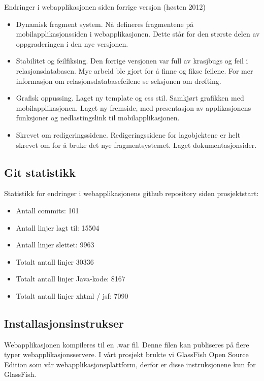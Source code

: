 \documentclass[../main.tex]{subfiles}
\begin{document}
\newpage

Endringer i webapplikasjonen siden forrige versjon (høsten 2012)
\begin{itemize}
\item Dynamisk fragment system. Nå defineres fragmentene på mobilapplikasjonssiden i webapplikasjonen. Dette står for den største delen av oppgraderingen i den nye versjonen.
\item Stabilitet og feilfiksing. Den forrige versjonen var full av krasjbugs og feil i relasjonsdatabasen. Mye arbeid ble gjort for å finne og fikse feilene. For mer informasjon om relasjonsdatabasefeilene se seksjonen om drøfting.
\item Grafisk oppussing. Laget ny template og css stil. Samkjørt grafikken med mobilapplikasjonen. Laget ny fremside, med presentasjon av applikasjonens funksjoner og nedlastingslink til mobilapplikasjonen.
\item Skrevet om redigeringssidene. Redigeringssidene for lagobjektene er helt skrevet om for å bruke det nye fragmentsystemet.
Laget dokumentasjonsider.
\end{itemize}

\subsection{Git statistikk}

Statistikk for endringer i webapplikasjonens github repository siden prosjektstart:
\begin{itemize}
\item Antall commits: 101
\item Antall linjer lagt til: 15504
\item Antall linjer slettet: 9963
\item Totalt antall linjer 30336
\item Totalt antall linjer Java-kode: 8167
\item Totalt antall linjer xhtml / jsf: 7090
\end{itemize}

\subsection{Installasjonsinstrukser}

Webapplikasjonen kompileres til en .war fil. Denne filen kan publiseres på flere typer webapplikasjonsservere. I vårt prosjekt brukte vi GlassFish Open Source Edition som vår webapplikasjonsplattform, derfor er disse instruksjonene kun for GlassFish.
\end{document}

